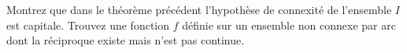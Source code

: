 
\begin{exercice}\label{exo0098}


Montrez que dans le théorème précédent l'hypothèse de connexité de l'ensemble $I$ est capitale. Trouvez une fonction $f$ définie sur un ensemble non connexe par arc dont la réciproque existe mais n'est pas continue.

\end{exercice}
